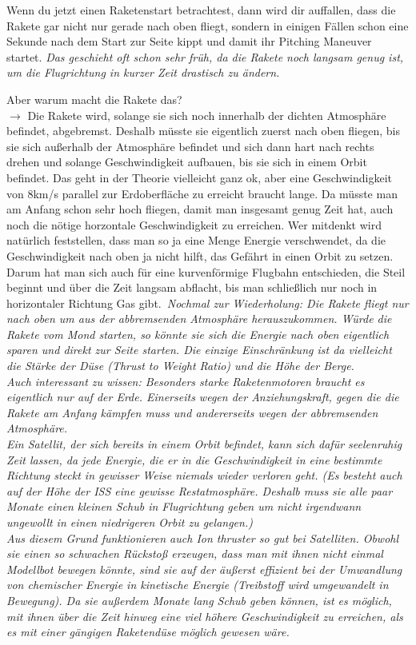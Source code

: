 \documentclass[12pt,paper=A4,numbers=noenddot,bibliography=totoc,listof=totoc,DIV=11,BCOR=1mm]{scrreprt}
\newcommand{\gq}[1]{\glqq #1\grqq} %
\begin{document}
Wenn du jetzt einen Raketenstart betrachtest, dann wird dir auffallen, dass die Rakete gar nicht nur gerade nach oben fliegt, sondern in einigen Fällen schon eine Sekunde nach dem Start zur Seite kippt und damit ihr \gq{Pitching Maneuver} startet. \emph{Das geschieht oft schon sehr früh, da die Rakete noch langsam genug ist, um die Flugrichtung in kurzer Zeit drastisch zu ändern.}

Aber warum macht die Rakete das?\\
$\rightarrow$ Die Rakete wird, solange sie sich noch innerhalb der dichten Atmosphäre befindet, abgebremst. Deshalb müsste sie eigentlich zuerst nach oben fliegen, bis sie sich außerhalb der Atmosphäre befindet und sich dann hart nach \gq{rechts} drehen und solange Geschwindigkeit aufbauen, bis sie sich in einem Orbit befindet. Das geht in der Theorie vielleicht ganz ok, aber eine Geschwindigkeit von 8km/s parallel zur Erdoberfläche zu erreicht braucht lange. Da müsste man am Anfang schon sehr hoch fliegen, damit man insgesamt genug Zeit hat, auch noch die nötige horzontale Geschwindigkeit zu erreichen.
Wer mitdenkt wird natürlich feststellen, dass man so ja eine Menge Energie verschwendet, da die Geschwindigkeit nach oben ja nicht hilft, das Gefährt in einen Orbit zu setzen.\\
Darum hat man sich auch für eine kurvenförmige Flugbahn entschieden, die Steil beginnt und über die Zeit langsam abflacht, bis man schließlich nur noch in horizontaler Richtung Gas gibt.\
\emph{Nochmal zur Wiederholung: Die Rakete fliegt nur nach oben um aus der abbremsenden Atmosphäre herauszukommen. Würde die Rakete vom Mond starten, so könnte sie sich die Energie nach oben eigentlich sparen und direkt zur Seite starten. Die einzige Einschränkung ist da vielleicht die Stärke der Düse (Thrust to Weight Ratio) und die Höhe der Berge.}\\



\emph{Auch interessant zu wissen: Besonders starke Raketenmotoren braucht es eigentlich nur auf der Erde. Einerseits wegen der Anziehungskraft, gegen die die Rakete am Anfang kämpfen muss und andererseits wegen der abbremsenden Atmosphäre.\\
Ein Satellit, der sich bereits in einem Orbit befindet, kann sich dafür seelenruhig Zeit lassen, da jede Energie, die er in die Geschwindigkeit in eine bestimmte Richtung steckt in gewisser Weise niemals wieder verloren geht. (Es besteht auch auf der Höhe der ISS eine gewisse Restatmosphäre. Deshalb muss sie alle paar Monate einen kleinen Schub in Flugrichtung geben um nicht irgendwann ungewollt in einen niedrigeren Orbit zu gelangen.)\\
Aus diesem Grund funktionieren auch \gq{Ion thruster} so gut bei Satelliten. Obwohl sie einen so schwachen Rückstoß erzeugen, dass man mit ihnen nicht einmal Modellbot bewegen könnte, sind sie auf der äußerst effizient bei der Umwandlung von chemischer Energie in kinetische Energie (Treibstoff wird umgewandelt in Bewegung). Da sie außerdem Monate lang Schub geben können, ist es möglich, mit ihnen über die Zeit hinweg eine viel höhere Geschwindigkeit zu erreichen, als es mit einer gängigen Raketendüse möglich gewesen wäre.}\\
\end{document}
